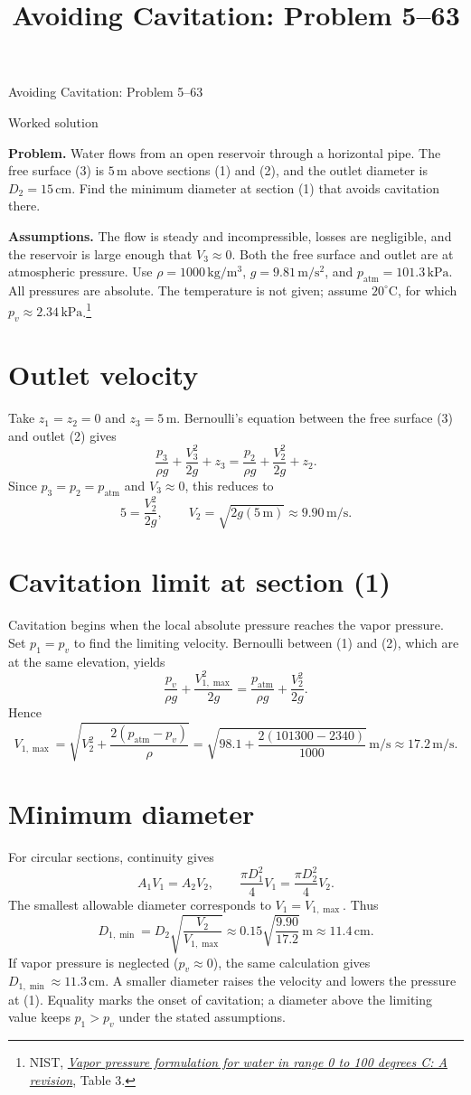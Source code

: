 \documentclass[11pt]{article}
\title{Avoiding Cavitation: Problem 5--63}
\author{}
\date{}
\numberwithin{equation}{section}
\begin{document}
\begin{center}
  {\Large Avoiding Cavitation: Problem 5--63}\par
  \smallskip
  Worked solution
\end{center}

\noindent\textbf{Problem.} Water flows from an open reservoir through a
horizontal pipe. The free surface (3) is $5\,\mathrm m$ above sections (1)
and (2), and the outlet diameter is $D_2=15\,\mathrm{cm}$. Find the minimum
diameter at section (1) that avoids cavitation there.

\medskip
\noindent\textbf{Assumptions.} The flow is steady and incompressible,
losses are negligible, and the reservoir is large enough that $V_3\approx0$.
Both the free surface and outlet are at atmospheric pressure. Use
$\rho=1000\,\mathrm{kg/m^3}$, $g=9.81\,\mathrm{m/s^2}$, and
$p_{\mathrm{atm}}=101.3\,\mathrm{kPa}$. All pressures are absolute.
The temperature is not given; assume $20^\circ\mathrm C$, for which
$p_v\approx2.34\,\mathrm{kPa}$.\footnote{NIST,
\href{https://nvlpubs.nist.gov/nistpubs/jres/80A/jresv80An5-6p775_A1b.pdf}
{\emph{Vapor pressure formulation for water in range 0 to
100 degrees C: A revision}}, Table 3.}

\section{Outlet velocity}
Take $z_1=z_2=0$ and $z_3=5\,\mathrm m$. Bernoulli's equation between
the free surface (3) and outlet (2) gives
\[
 \frac{p_3}{\rho g}+\frac{V_3^2}{2g}+z_3
 =\frac{p_2}{\rho g}+\frac{V_2^2}{2g}+z_2.
\]
Since $p_3=p_2=p_{\mathrm{atm}}$ and $V_3\approx0$, this reduces to
\[
 5=\frac{V_2^2}{2g},
 \qquad
 V_2=\sqrt{2g(5\,\mathrm m)}\approx9.90\,\mathrm{m/s}.
\]

\section{Cavitation limit at section (1)}
Cavitation begins when the local absolute pressure reaches the vapor
pressure. Set $p_1=p_v$ to find the limiting velocity. Bernoulli between
(1) and (2), which are at the same elevation, yields
\[
 \frac{p_v}{\rho g}+\frac{V_{1,\max}^2}{2g}
 =\frac{p_{\mathrm{atm}}}{\rho g}+\frac{V_2^2}{2g}.
\]
Hence
\[
 V_{1,\max}
 =\sqrt{V_2^2+\frac{2(p_{\mathrm{atm}}-p_v)}{\rho}}
 =\sqrt{98.1+\frac{2(101300-2340)}{1000}}\,\mathrm{m/s}
 \approx17.2\,\mathrm{m/s}.
\]

\section{Minimum diameter}
For circular sections, continuity gives
\[
 A_1V_1=A_2V_2,
 \qquad
 \frac{\pi D_1^2}{4}V_1=\frac{\pi D_2^2}{4}V_2.
\]
The smallest allowable diameter corresponds to $V_1=V_{1,\max}$. Thus
\[
 D_{1,\min}
 =D_2\sqrt{\frac{V_2}{V_{1,\max}}}
 \approx0.15\sqrt{\frac{9.90}{17.2}}\,\mathrm m
 \approx\boxed{11.4\,\mathrm{cm}}.
\]
If vapor pressure is neglected ($p_v\approx0$), the same calculation gives
$D_{1,\min}\approx11.3\,\mathrm{cm}$.
A smaller diameter raises the velocity and lowers the pressure at (1).
Equality marks the onset of cavitation; a diameter above the limiting value
keeps $p_1>p_v$ under the stated assumptions.
\end{document}
